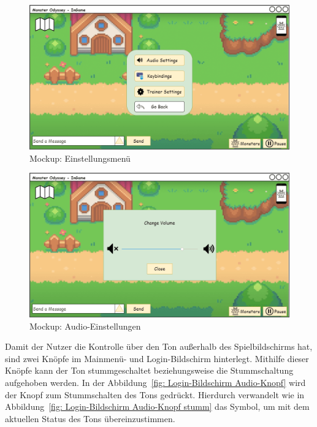 \begin{figure}[H]
    \center
    \includegraphics[scale=\scale]{images/mockups/Bonusfeatures/AudioIngame/IngameSettingsMenu.png}
    \caption{Mockup: Einstellungsmenü}
    \label{fig: Einstellungsmenü}
\end{figure}
\begin{figure}[H]
    \center
    \includegraphics[scale=\scale]{images/mockups/Bonusfeatures/AudioIngame/AudioSettings.png}
    \caption{Mockup: Audio-Einstellungen}
    \label{fig: Audio-Einstellungen}
\end{figure}
Damit der Nutzer die Kontrolle über den Ton außerhalb des Spielbildschirms hat, sind zwei Knöpfe im Mainmenü- und Login-Bildschirm hinterlegt. Mithilfe dieser Knöpfe kann der Ton stummgeschaltet beziehungsweise die Stummschaltung aufgehoben werden. In der Abbildung~\ref{fig: Login-Bildschirm Audio-Knopf} wird der Knopf zum Stummschalten des Tons gedrückt. Hierdurch verwandelt wie in Abbildung~\ref{fig: Login-Bildschirm Audio-Knopf stumm} das Symbol, um mit dem aktuellen Status des Tons übereinzustimmen.
